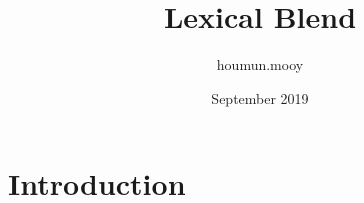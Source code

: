 \documentclass{article}
\title{Lexical Blend}
\author{houmun.mooy }
\date{September 2019}
\begin{document}
\maketitle

\section{Introduction}
\end{document}
